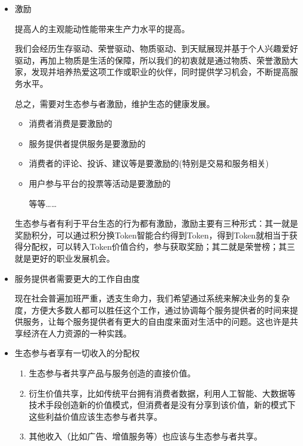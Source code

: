\documentclass[UTF9]{ctexart}
\begin{document}
\begin{itemize}
\item 激励

提高人的主观能动性能带来生产力水平的提高。

我们会经历生存驱动、荣誉驱动、物质驱动、到天赋展现并基于个人兴趣爱好驱动，再加上物质是生活的保障，所以我们的初衷就是通过物质、荣誉激励大家，发现并培养热爱这项工作或职业的伙伴，同时提供学习机会，不断提高服务水平。

总之，需要对生态参与者激励，维护生态的健康发展。
\begin{itemize}
\item 消费者消费是要激励的
\item 服务提供者提供服务是要激励的
\item 消费者的评论、投诉、建议等是要激励的(特别是交易和服务相关)
\item 用户参与平台的投票等活动是要激励的

等等……
\end{itemize}

生态参与者有利于平台生态的行为都有激励，激励主要有三种形式：其一就是奖励积分，可以通过积分换Token智能合约得到Token，得到Token就相当于获得分配权，可以转入Token价值合约，参与获取奖励；其二就是荣誉榜；其三就是更好的职业发展机会。

\item 服务提供者需要更大的工作自由度

现在社会普遍加班严重，透支生命力，我们希望通过系统来解决业务的复杂度，方便大多数人都可以胜任这个工作，通过协调每个服务提供者的时间来提供服务，让每个服务提供者有更大的自由度来面对生活中的问题。这也许是共享经济在人力资源的一种实践。


\item 生态参与者享有一切收入的分配权

\begin{enumerate}

\item 生态参与者共享产品与服务创造的直接价值。

\item 衍生价值共享，比如传统平台拥有消费者数据，利用人工智能、大数据等技术手段创造新的价值模式，但消费者是没有分享到该价值，新的模式下这些利益价值应该生态参与者共享。

\item 其他收入（比如广告、增值服务等）也应该与生态参与者共享。

\end{enumerate}


\end{itemize}
\end{document}
